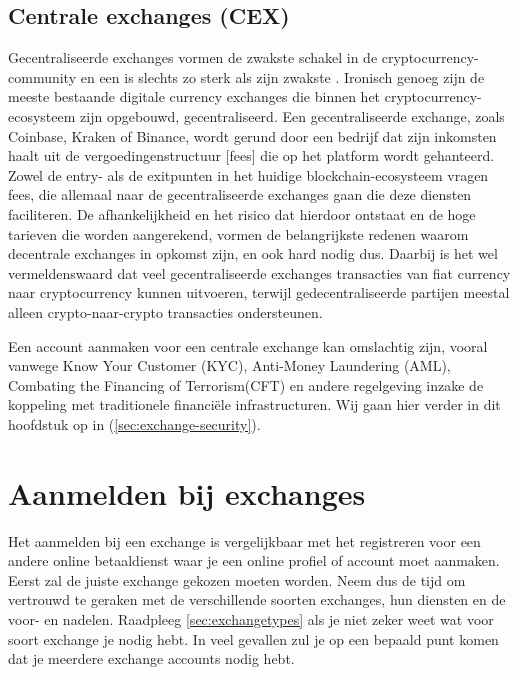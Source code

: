 \subsection*{Centrale exchanges (CEX)}
\label{subsubsec:CEX}
Gecentraliseerde exchanges vormen de zwakste schakel in de cryptocurrency-community en een  is slechts zo sterk als zijn zwakste . Ironisch genoeg zijn de meeste bestaande digitale currency exchanges die binnen het cryptocurrency-ecosysteem zijn opgebouwd, gecentraliseerd. Een gecentraliseerde exchange, zoals Coinbase, Kraken of Binance, wordt gerund door een bedrijf dat zijn inkomsten haalt uit de vergoedingenstructuur [fees] die op het platform wordt gehanteerd. Zowel de entry- als de exitpunten in het huidige blockchain-ecosysteem vragen fees, die allemaal naar de gecentraliseerde exchanges gaan die deze diensten faciliteren. De afhankelijkheid en het risico dat hierdoor ontstaat en de hoge tarieven die worden aangerekend, vormen de belangrijkste redenen waarom decentrale exchanges in opkomst zijn, en ook hard nodig dus. Daarbij is het wel vermeldenswaard dat veel gecentraliseerde exchanges transacties van fiat currency naar cryptocurrency kunnen uitvoeren, terwijl gedecentraliseerde partijen meestal alleen crypto-naar-crypto transacties ondersteunen.

\medskip

Een account aanmaken voor een centrale exchange kan omslachtig zijn, vooral vanwege Know Your Customer (KYC), Anti-Money Laundering (AML), Combating the Financing of Terrorism(CFT) en andere regelgeving inzake de koppeling met traditionele financi{\"e}le infrastructuren. Wij gaan hier verder in dit hoofdstuk op in (\cref{sec:exchange-security}). 



\section{Aanmelden bij exchanges}
\label{sec:exchange-sign-up}
Het aanmelden bij een exchange is vergelijkbaar met het registreren voor een andere online betaaldienst waar je een online profiel of account moet aanmaken. Eerst zal de juiste exchange gekozen moeten worden. Neem dus de tijd om vertrouwd te geraken met de verschillende soorten exchanges, hun diensten en de voor- en nadelen. Raadpleeg \cref{sec:exchangetypes} als je niet zeker weet wat voor soort exchange je nodig hebt. In veel gevallen zul je op een bepaald punt komen dat je meerdere exchange accounts nodig hebt. 

